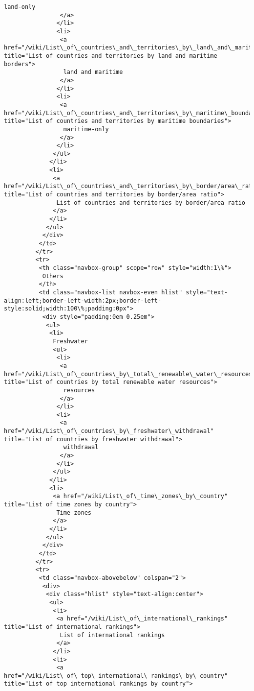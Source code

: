 \documentclass[11pt]{article}
\begin{document}
\begin{Verbatim}[commandchars=\\\{\}]
                 land-only
                </a>
               </li>
               <li>
                <a href="/wiki/List\_of\_countries\_and\_territories\_by\_land\_and\_maritime\_borders" title="List of countries and territories by land and maritime borders">
                 land and maritime
                </a>
               </li>
               <li>
                <a href="/wiki/List\_of\_countries\_and\_territories\_by\_maritime\_boundaries" title="List of countries and territories by maritime boundaries">
                 maritime-only
                </a>
               </li>
              </ul>
             </li>
             <li>
              <a href="/wiki/List\_of\_countries\_and\_territories\_by\_border/area\_ratio" title="List of countries and territories by border/area ratio">
               List of countries and territories by border/area ratio
              </a>
             </li>
            </ul>
           </div>
          </td>
         </tr>
         <tr>
          <th class="navbox-group" scope="row" style="width:1\%">
           Others
          </th>
          <td class="navbox-list navbox-even hlist" style="text-align:left;border-left-width:2px;border-left-style:solid;width:100\%;padding:0px">
           <div style="padding:0em 0.25em">
            <ul>
             <li>
              Freshwater
              <ul>
               <li>
                <a href="/wiki/List\_of\_countries\_by\_total\_renewable\_water\_resources" title="List of countries by total renewable water resources">
                 resources
                </a>
               </li>
               <li>
                <a href="/wiki/List\_of\_countries\_by\_freshwater\_withdrawal" title="List of countries by freshwater withdrawal">
                 withdrawal
                </a>
               </li>
              </ul>
             </li>
             <li>
              <a href="/wiki/List\_of\_time\_zones\_by\_country" title="List of time zones by country">
               Time zones
              </a>
             </li>
            </ul>
           </div>
          </td>
         </tr>
         <tr>
          <td class="navbox-abovebelow" colspan="2">
           <div>
            <div class="hlist" style="text-align:center">
             <ul>
              <li>
               <a href="/wiki/List\_of\_international\_rankings" title="List of international rankings">
                List of international rankings
               </a>
              </li>
              <li>
               <a href="/wiki/List\_of\_top\_international\_rankings\_by\_country" title="List of top international rankings by country">

\end{Verbatim}
\end{document}
